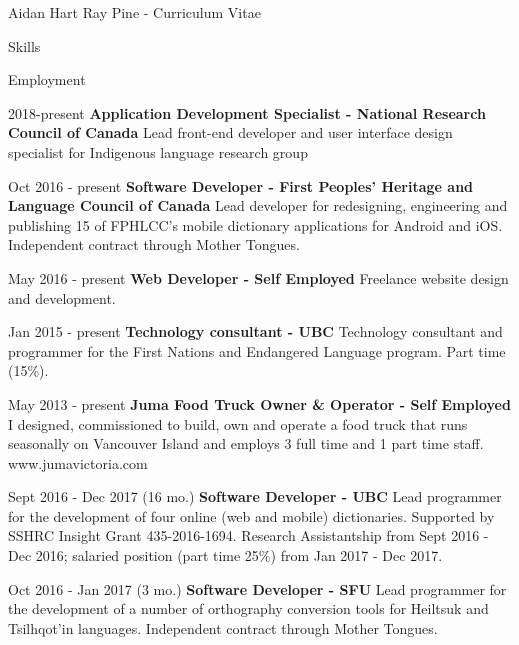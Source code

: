 \documentclass[12pt]{letter}
\begin{document}
\begin{cv}{ Aidan Hart Ray Pine  \space - \space   Curriculum Vitae}
\begin{cvlist}{Skills}
         \end{cvlist}
        \begin{cvlist}{Employment}
            \item[2018-present] \textbf{Application Development Specialist - National Research Council of Canada}
            \newline Lead front-end developer and user interface design specialist for Indigenous language research group
            \item[Oct 2016 - present] \textbf{Software Developer - First Peoples' Heritage and Language Council of Canada}
            \newline Lead developer for redesigning, engineering and publishing 15 of FPHLCC's mobile dictionary applications for Android and iOS. Independent contract through Mother Tongues.
            
            \item[May 2016 - present] \textbf{Web Developer - Self Employed}
            \newline Freelance website design and development.
            
            \item[Jan 2015 - present] \textbf{Technology consultant - UBC}
            \newline Technology consultant and programmer for the First Nations and Endangered Language program. Part time (15\%).
            
                    \item[May 2013 - present] \textbf{Juma Food Truck Owner \& Operator - Self Employed}
            \newline I designed, commissioned to build, own and operate a food truck that runs seasonally on Vancouver Island and employs 3 full time and 1 part time staff. www.jumavictoria.com
            
                    \item[Sept 2016 - Dec 2017 (16 mo.)] \textbf{Software Developer - UBC}
            \newline Lead programmer for the development of four online (web and mobile) dictionaries. Supported by SSHRC Insight Grant 435-2016-1694. Research Assistantship from Sept 2016 - Dec 2016; salaried position (part time 25\%) from Jan 2017 - Dec 2017.
            
            \item[Oct 2016 - Jan 2017 (3 mo.)] \textbf{Software Developer - SFU}
            \newline Lead programmer for the development of a number of orthography conversion tools for Heiltsuk and Tsilhqot'in languages. Independent contract through Mother Tongues.
            

\end{cvlist}
\end{cv}
\end{document}
